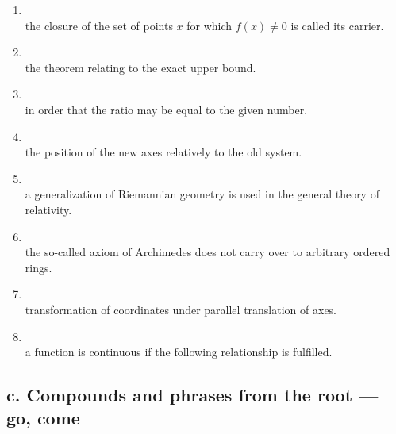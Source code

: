 \begin{enumerate}[label=\arabic*)]
\item {}\\
      the closure of the set of points $x$ for which $f(x)\ne0$ is called its carrier.
\item {}\\
      the theorem relating to the exact upper bound.
\item {}\\
      in order that the ratio may be equal to the given number.
\item {}\\
      the position of the new axes relatively to the old system.
\item {}\\
      a generalization of Riemannian geometry is used in the general theory of relativity.
\item {}\\
      the so-called axiom of Archimedes does not carry over to arbitrary ordered rings.
\item {}\\
      transformation of coordinates under parallel translation of axes.
\item {}\\
      a function is continuous if the following relationship is fulfilled.
\end{enumerate}

\subsection*{c. Compounds and phrases from the root  --- go, come}

